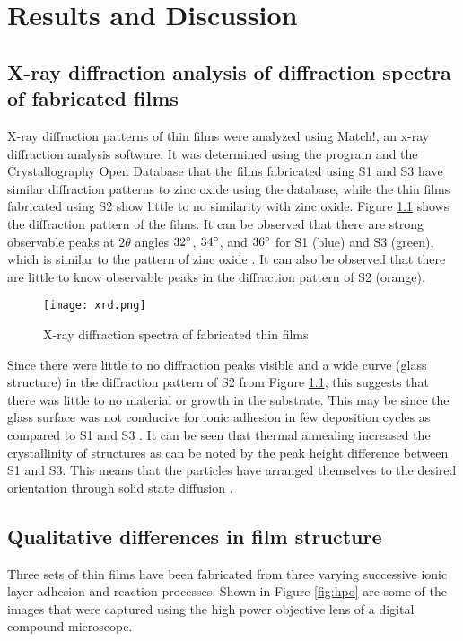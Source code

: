 \chapter{Results and Discussion}

\section[XRD analysis of diffraction spectra]{X-ray diffraction analysis of diffraction spectra of fabricated films}

X-ray diffraction patterns of thin films were analyzed using Match!, an x-ray diffraction analysis software.
It was determined using the program and the Crystallography Open Database that the films fabricated using S1 and S3 have similar diffraction patterns to zinc oxide using the database, while the thin films fabricated using S2 show little to no similarity with zinc oxide.
Figure \ref{fig:xrd} shows the diffraction pattern of the films. It can be observed that there are strong observable peaks at $2\theta$ angles $32^{\circ}$, $34^{\circ}$, and $36^{\circ}$ for S1 (blue) and S3 (green), which is similar to the pattern of zinc oxide \cite{gao08}.
It can also be observed that there are little to know observable peaks in the diffraction pattern of S2 (orange).

\begin{figure}
  \centering
  \texttt{[image: xrd.png]}
  \caption{X-ray diffraction spectra of fabricated thin films}
  \label{fig:xrd}
\end{figure}

Since there were little to no diffraction peaks visible and a wide curve (glass structure) in the diffraction pattern of S2 from Figure \ref{fig:xrd}, this suggests that there was little to no material or growth in the substrate.
This may be since the glass surface was not conducive for ionic adhesion in few deposition cycles as compared to S1 and S3 \cite{gao08}.
It can be seen that thermal annealing increased the crystallinity of structures as can be noted by the peak height difference between S1 and S3.
This means that the particles have arranged themselves to the desired orientation through solid state diffusion \cite{fdoping}.

\section{Qualitative differences in film structure}

Three sets of thin films have been fabricated from three varying successive ionic layer adhesion and reaction processes.
Shown in Figure \ref{fig:hpo} are some of the images that were captured using the high power objective lens of a digital compound microscope.

